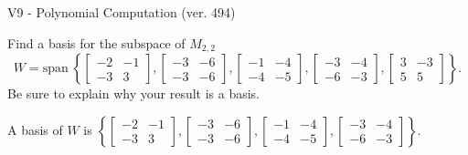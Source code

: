 \begin{exercise}
  \begin{exerciseTitle}V9 - Polynomial Computation (ver. 494)\end{exerciseTitle}
  \begin{exerciseStatement}
    Find a basis for the subspace of \(M_{2,2}\) 
\[W=\mathrm{span}\ \left\{\left[\begin{array}{cc}
-2 & -1 \\
-3 & 3
\end{array}\right] , \left[\begin{array}{cc}
-3 & -6 \\
-3 & -6
\end{array}\right] , \left[\begin{array}{cc}
-1 & -4 \\
-4 & -5
\end{array}\right] , \left[\begin{array}{cc}
-3 & -4 \\
-6 & -3
\end{array}\right] , \left[\begin{array}{cc}
3 & -3 \\
5 & 5
\end{array}\right]\right\}.\]
 Be sure to explain why your result is a basis.


  \end{exerciseStatement}
  \begin{exerciseAnswer}
   A basis of \(W\) is  \(\left\{\left[\begin{array}{cc}
-2 & -1 \\
-3 & 3
\end{array}\right] , \left[\begin{array}{cc}
-3 & -6 \\
-3 & -6
\end{array}\right] , \left[\begin{array}{cc}
-1 & -4 \\
-4 & -5
\end{array}\right] , \left[\begin{array}{cc}
-3 & -4 \\
-6 & -3
\end{array}\right]\right\}\).
  


  \end{exerciseAnswer}
\end{exercise}